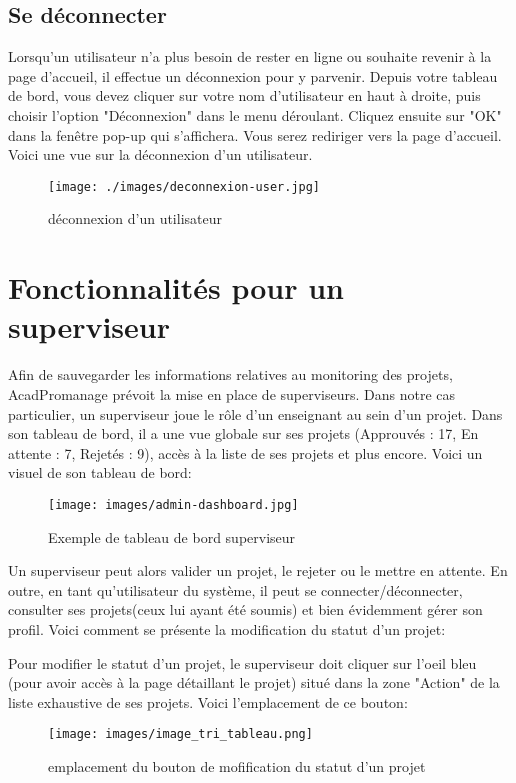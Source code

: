 \documentclass[12pt]{article}
\begin{document}
\bigskip
\subsection{Se déconnecter}
Lorsqu'un utilisateur n'a plus besoin de rester en ligne ou souhaite revenir à la page d'accueil, il effectue un déconnexion pour y parvenir. Depuis votre tableau de bord, vous devez cliquer sur votre nom d'utilisateur en haut à droite, puis choisir l'option "Déconnexion" dans le menu déroulant. Cliquez ensuite sur "OK" dans la fenêtre pop-up qui s'affichera. Vous serez rediriger vers la page d'accueil. Voici une vue sur la déconnexion d'un utilisateur.

    \begin{figure}[h!]
            \centering
            \texttt{[image: ./images/deconnexion-user.jpg]}
            \caption{déconnexion d'un utilisateur}
            \label{fig:déconnexion d'un utilisateur}
    \end{figure}

\bigskip    
\section{Fonctionnalités pour un superviseur}
Afin de sauvegarder les informations relatives au monitoring des projets, AcadPromanage prévoit la mise en place de superviseurs. Dans notre cas particulier, un superviseur joue le rôle d'un enseignant au sein d'un projet. Dans son tableau de bord, il a une vue globale sur ses projets (Approuvés : 17, En attente : 7, Rejetés : 9), accès à la liste de ses projets et plus encore. Voici un visuel de son tableau de bord:
    \begin{figure}[h!]
        \centering
        \texttt{[image: images/admin-dashboard.jpg]}
        \caption{Exemple de tableau de bord superviseur}
        \label{fig:dashboard enseignant}
    \end{figure}

Un superviseur peut alors valider un projet, le rejeter ou le mettre en attente. En outre, en tant qu'utilisateur du système, il peut se connecter/déconnecter, consulter ses projets(ceux lui ayant été soumis) et bien évidemment gérer son profil. Voici comment se présente la modification du statut d'un projet:

\bigskip
Pour modifier le statut d'un projet, le superviseur doit cliquer sur l'oeil bleu (pour avoir accès à la page détaillant le projet) situé dans la zone "Action" de la liste exhaustive de ses projets. Voici l'emplacement de ce bouton:
\begin{figure}[h!]
        \centering
        \texttt{[image: images/image\_tri\_tableau.png]}
        \caption{emplacement du bouton de mofification du statut d'un projet}
        \label{fig:bouton de mofification du statut d'un projet}
    \end{figure}
\end{document}
